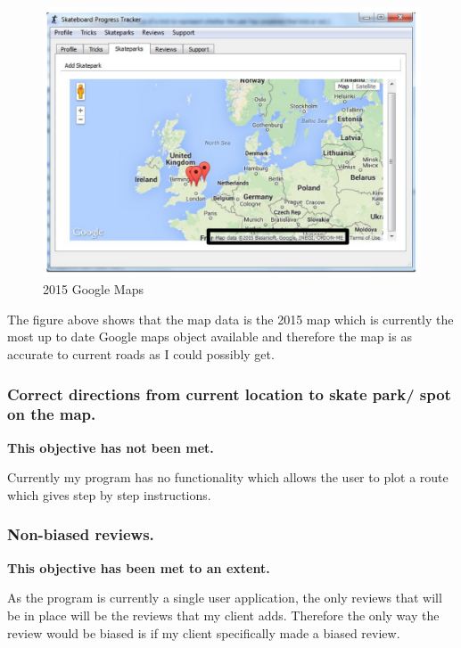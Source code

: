 \begin{figure}[H]
    \includegraphics[width=\textwidth]{./Evaluation/images/RecentMap.pdf}
    \caption{2015 Google Maps} \label{fig:RecentMap}
\end{figure}

The figure above shows that the map data is the 2015 map which is currently the most up to date Google maps object available and therefore the map is as accurate to current roads as I could possibly get.



\subsubsection {Correct directions from current location to skate park/ spot on the map.}

\textbf{This objective has not been met.}

Currently my program has no functionality which allows the user to plot a route which gives step by step instructions.



\subsubsection{Non-biased reviews.}

\textbf{This objective has been met to an extent.}

As the program is currently a single user application, the only reviews that will be in place will be the reviews that my client adds. Therefore the only way the review would be biased is if my client specifically made a biased review. 



